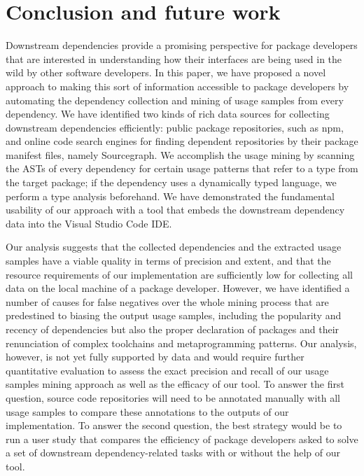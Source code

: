 \section{Conclusion and future work}
\label{sec:conclusion}

Downstream dependencies provide a promising perspective for package developers that are interested in understanding how their interfaces are being used in the wild by other software developers.
In this paper, we have proposed a novel approach to making this sort of information accessible to package developers by automating the dependency collection and mining of usage samples from every dependency.
We have identified two kinds of rich data sources for collecting downstream dependencies efficiently: public package repositories, such as npm, and online code search engines for finding dependent repositories by their package manifest files, namely Sourcegraph.
We accomplish the usage mining by scanning the ASTs of every dependency for certain usage patterns that refer to a type from the target package; if the dependency uses a dynamically typed language, we perform a type analysis beforehand.
We have demonstrated the fundamental usability of our approach with a tool that embeds the downstream dependency data into the Visual Studio Code IDE.

Our analysis suggests that the collected dependencies and the extracted usage samples have a viable quality in terms of precision and extent, and that the resource requirements of our implementation are sufficiently low for collecting all data on the local machine of a package developer.
However, we have identified a number of causes for false negatives over the whole mining process that are predestined to biasing the output usage samples, including the popularity and recency of dependencies but also the proper declaration of packages and their renunciation of complex toolchains and metaprogramming patterns.
Our analysis, however, is not yet fully supported by data and would require further quantitative evaluation to assess the exact precision and recall of our usage samples mining approach as well as the efficacy of our tool.
To answer the first question, source code repositories will need to be annotated manually with all usage samples to compare these annotations to the outputs of our implementation.
To answer the second question, the best strategy would be to run a user study that compares the efficiency of package developers asked to solve a set of downstream dependency-related tasks with or without the help of our tool.

